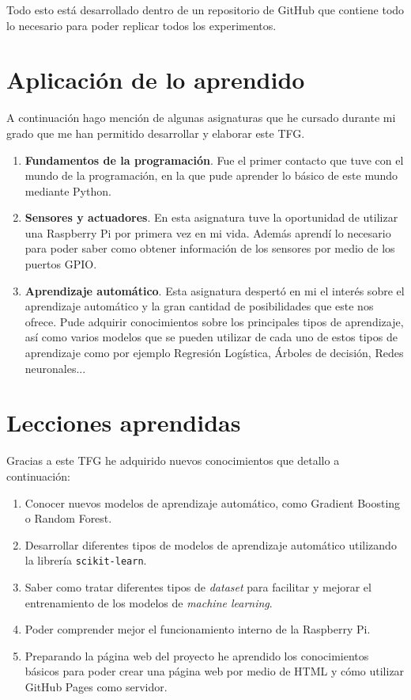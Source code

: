 \documentclass[a4paper, 12pt]{book}
\begin{document}
Todo esto está desarrollado dentro de un repositorio de GitHub que contiene todo lo necesario para poder replicar todos los experimentos.

\section{Aplicación de lo aprendido}
\label{sec:aplicacion}

A continuación hago mención de algunas asignaturas que he cursado durante mi grado que me han permitido desarrollar y elaborar este TFG.

\begin{enumerate}
    \item \textbf{Fundamentos de la programación}. Fue el primer contacto que tuve con el mundo de la programación, en la que pude aprender lo básico de este mundo mediante Python.

    \item \textbf{Sensores y actuadores}. En esta asignatura tuve la oportunidad de utilizar una Raspberry Pi por primera vez en mi vida. Además aprendí lo necesario para poder saber como obtener información de los sensores por medio de los puertos GPIO.
    
    \item \textbf{Aprendizaje automático}. Esta asignatura despertó en mi el interés sobre el aprendizaje automático y la gran cantidad de posibilidades que este nos ofrece. Pude adquirir conocimientos sobre los principales tipos de aprendizaje, así como varios modelos que se pueden utilizar de cada uno de estos tipos de aprendizaje como por ejemplo Regresión Logística, Árboles de decisión, Redes neuronales...

\end{enumerate}


\section{Lecciones aprendidas}
\label{sec:lecciones_aprendidas}

Gracias a este TFG he adquirido nuevos conocimientos que detallo a continuación:

\begin{enumerate}
  \item Conocer nuevos modelos de aprendizaje automático, como Gradient Boosting o Random Forest.
  \item Desarrollar diferentes tipos de modelos de aprendizaje automático utilizando la librería \texttt{scikit-learn}.
  \item Saber como tratar diferentes tipos de \textit{dataset} para facilitar y mejorar el entrenamiento de los modelos de \textit{machine learning}.
  \item Poder comprender mejor el funcionamiento interno de la Raspberry Pi.
  \item Preparando la página web del proyecto he aprendido los conocimientos básicos para poder crear una página web por medio de HTML y cómo utilizar GitHub Pages como servidor.
\end{enumerate} 
\end{document}
